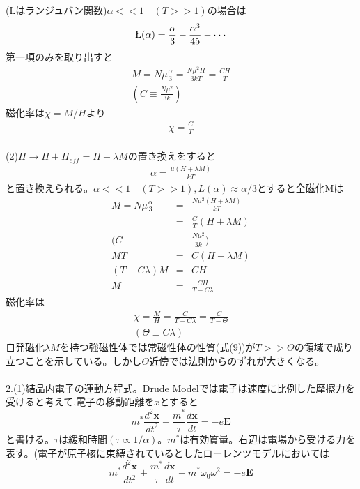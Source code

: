 \documentclass{jsarticle}
\begin{document}
(Lはランジュバン関数)\quad$\alpha<<1\quad(T>>1)$の場合は
\begin{eqnarray}
\L(\alpha)=\frac{\alpha}{3}-\frac{\alpha^3}{45}-\cdot\cdot\cdot
\end{eqnarray}
第一項のみを取り出すと
\begin{eqnarray}
M=N\mu\frac{\alpha}{3}=\frac{N\mu^2H}{3kT}=\frac{CH}{T}\\
(C\equiv\frac{N\mu^2}{3k})
\end{eqnarray}
磁化率は$\chi=M/H$より
\begin{eqnarray}
\chi=\frac{C}{T}
\end{eqnarray}
\\\quad(2)$H\rightarrow H+H_{eff}=H+\lambda M$の置き換えをすると
\begin{eqnarray}
\alpha=\frac{\mu (H+\lambda M)}{kT} 
\end{eqnarray}
と置き換えられる。$\alpha<<1\quad(T>>1),L(\alpha)\approx\alpha/3$とすると全磁化Mは
\begin{eqnarray}
M=N\mu\frac{\alpha}{3}&=&\frac{N\mu^2(H+\lambda M)}{kT}\\
&=&\frac{C}{T}(H+\lambda M)\nonumber\\
\Big( C&\equiv&\frac{N\mu^2}{3k}\Big)\nonumber\\
MT&=&C(H+\lambda M)\nonumber\\
(T-C\lambda)M&=&CH\nonumber\\
M&=&\frac{CH}{T-C\lambda}
\end{eqnarray}
磁化率は
\begin{eqnarray}
\chi=\frac{M}{H}=\frac{C}{T-C\lambda}=\frac{C}{T-\Theta} \\
(\Theta\equiv C\lambda )
\end{eqnarray}
自発磁化$\lambda M$を持つ強磁性体では常磁性体の性質(式(9))が$T>>\Theta$の領域で成り立つことを示している。しかし$\Theta$近傍では法則からのずれが大きくなる。
\\
\\2.(1)結晶内電子の運動方程式。Drude Modelでは電子は速度に比例した摩擦力を受けると考えて,電子の移動距離を$x$とすると
\begin{equation}
m^\ast\frac{d^2\bm{x}}{dt^2}+\frac{m^\ast}{\tau}\frac{d\bm{x}}{dt}=-e\bm{E}
\end{equation}
と書ける。$\tau$は緩和時間$(\tau\propto 1/\alpha)$。$m^\ast$は有効質量。右辺は電場から受ける力を表す。(電子が原子核に束縛されているとしたローレンツモデルにおいては
\begin{equation}
m^\ast\frac{d^2\bm{x}}{dt^2}+\frac{m^\ast}{\tau}\frac{d\bm{x}}{dt}+m^\ast\omega_0\omega^2=-e\bm{E}
\end{equation}
\end{document}
